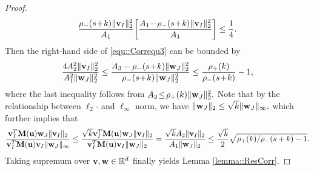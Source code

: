 \documentclass[twoside,11pt]{article}
\newcommand*{\BR}{\mathbb{R}}
\begin{document}
\begin{proof}
\begin{align*}
  \frac{  \rho_{-}(s\!+\!k  )  \| \mathbf{v}_I \|_2^2}{A_1}\biggl [ \frac{ A_1 \!-\! \rho_{-}(s\!+\!k )  \|\mathbf{v}_I \|_2^2}{A_1}\biggr] \leq \frac{1}{4}.
 \end{align*}
 Then the right-hand side of \eqref{equ::Correqu3} can be bounded by
 \begin{align*}
  \frac{4 A_2^2 \|\mathbf{v}_I \|_2^2}{A_1^2  \|\mathbf{w}_J \|_2^2} \leq\frac{A_3  - \rho_{-}(s\!+\!k )  \|\mathbf{w}_J \|_2^2 }{\rho_{-}(s\!+\!k ) \|\mathbf{w}_J \|_2^2} \leq \frac{\rho_{+} (k)}{\rho_{-} (s\!+\!k ) }-1,
 \end{align*}
 where the last inequality follows from $ A_3 \!\leq \! \rho_{+} (k) \|\mathbf{w}_J\|_2^2.$
 Note that by the relationship between $\ell_2$- and $\ell_\infty$ norm, we have 
 $\|\mathbf{w}_J  \|_2 \leq \sqrt{k} \| \mathbf{w}_J\|_\infty,$ which further implies that
$$
\frac{\mathbf{v} _{I}^T \mathbf{M}(\mathbf{u}) \mathbf{w}_{J}  \|\mathbf{v}_I \|_2}{\mathbf{v}_{I} ^T \mathbf{M}(\mathbf{u})  \mathbf{v}_{I} \|\mathbf{w}_{J} \|_{\infty}} \leq \frac{\sqrt{k}\mathbf{v} _{I}^T \mathbf{M}(\mathbf{u}) \mathbf{w}_{J}  \|\mathbf{v}_I \|_2}{\mathbf{v}_{I} ^T \mathbf{M}(\mathbf{u}) \mathbf{v}_{I} \|\mathbf{w}_{J} \|_{2}}= \frac{\sqrt{k}A_2   \| \mathbf{v}_{I}   \|_2 }{A_1 \| \mathbf{w}_J  \|_2} \leq  \frac{\sqrt{k}}{2} \sqrt{\rho_{+}(k) / \rho_{-}(s+ k) -1}.
$$
Taking supremum over $\vb, \wb \in \BR^{d}$ finally yields Lemma \ref{lemma::ResCorr}.
\end{proof}
\end{document}

